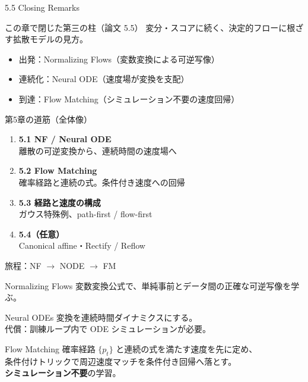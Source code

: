 

\begin{frame}{5.5 Closing Remarks}
    \begin{block}{この章で閉じた第三の柱（論文 5.5）}
        変分・スコアに続く、決定的フローに根ざす拡散モデルの見方。
    \end{block}
    \begin{itemize}
        \item 出発：Normalizing Flows（変数変換による可逆写像）
        \item 連続化：Neural ODE（速度場が変換を支配）
        \item 到達：Flow Matching（シミュレーション不要の速度回帰）
    \end{itemize}
\end{frame}
\asmain
\begin{frame}{第5章の道筋（全体像）}
    \begin{enumerate}
        \item \textbf{5.1 NF / Neural ODE}\\
        離散の可逆変換から、連続時間の速度場へ
        \item \textbf{5.2 Flow Matching}\\
        確率経路と連続の式。条件付き速度への回帰
        \item \textbf{5.3 経路と速度の構成}\\
        ガウス特殊例、path-first / flow-first
        \item \textbf{5.4（任意）}\\
        Canonical affine・Rectify / Reflow
    \end{enumerate}
\end{frame}
\asmain
\begin{frame}{旅程：NF $\to$ NODE $\to$ FM}
    \begin{block}{Normalizing Flows}
        変数変換公式で、単純事前とデータ間の正確な可逆写像を学ぶ。
    \end{block}
    \begin{block}{Neural ODEs}
        変換を連続時間ダイナミクスにする。\\
        代償：訓練ループ内で ODE シミュレーションが必要。
    \end{block}
    \begin{block}{Flow Matching}
        確率経路 $\{p_t\}$ と連続の式を満たす速度を先に定め、\\
        条件付けトリックで周辺速度マッチを条件付き回帰へ落とす。\\
        \textbf{シミュレーション不要}の学習。
    \end{block}
\end{frame}

